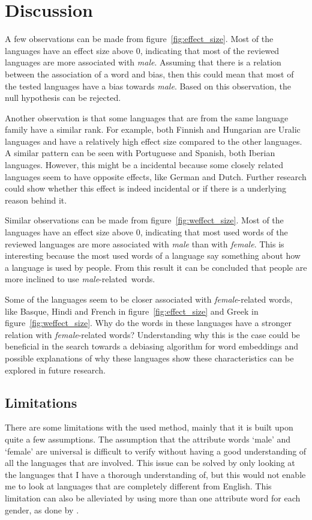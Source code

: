 \section{Discussion}
A few observations can be made from figure~\ref{fig:effect_size}. Most
of the languages have an effect size above 0, indicating that most of the reviewed
languages are more associated with \emph{male}. Assuming that there is a relation between
the association of a word and bias, then this could mean that
most of the tested languages have a bias towards \emph{male}. Based on this observation,
the null hypothesis can be rejected.

Another observation is that some languages that are from the same language family have
a similar rank. For example, both Finnish and Hungarian are Uralic languages and have a
relatively high effect size compared to the other languages. A similar pattern can be seen
with Portuguese and Spanish, both Iberian languages. However, this might be a incidental
because some closely related languages seem to have opposite effects, like German and
Dutch. Further research could show whether this effect is indeed incidental or if
there is a underlying reason behind it.

Similar observations can be made from figure~\ref{fig:weffect_size}. Most
of the languages have an effect size above 0, indicating that most used words of the
reviewed languages are more associated with \emph{male} than with \emph{female}. This
is interesting because the most used words of a language say something about how a
language is used by people.
From this result it can be concluded that people are more inclined to use
\mbox{\emph{male}-related words}.

Some of the languages seem to be closer associated with \emph{female}-related words, like
Basque, Hindi and French in figure~\ref{fig:effect_size} and Greek in
figure~\ref{fig:weffect_size}. Why do the words in these languages have a stronger
relation with \emph{female}-related words?
Understanding why this is
the case could be beneficial in the search towards a debiasing algorithm for word
embeddings and possible explanations of why these languages show these characteristics can
be explored in future research.

\subsection{Limitations}
There are some limitations with the used method, mainly that it is built upon quite a few
assumptions.
The assumption that the attribute words `male' and `female' are universal is difficult
to verify without having a good understanding of all the languages that are involved.
This issue can be solved by only looking at the languages that I have a thorough
understanding of, but this would not enable me to look at languages that are completely
different from English. This limitation can also be alleviated by using more than one
attribute word for each gender, as done by \textcite{caliskan_2017_semantics_language_corpora}.

